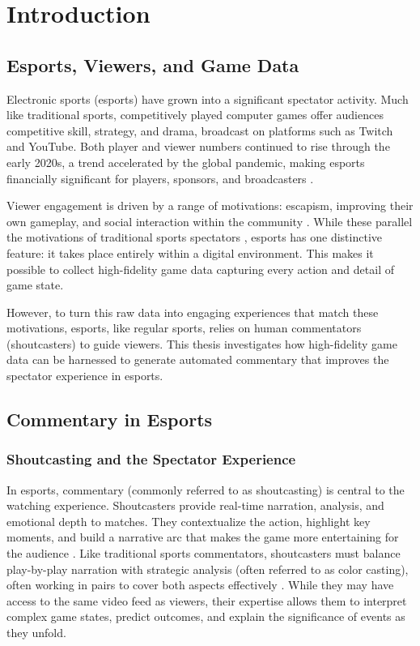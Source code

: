 \chapter{Introduction}
\label{chap:introduction}
\section{Esports, Viewers, and Game Data} 
Electronic sports (esports) have grown into a significant spectator activity. Much like traditional sports, competitively played computer games offer audiences competitive skill, strategy, and drama, broadcast on platforms such as Twitch and YouTube\cite{hamari2017, qian2020}. Both player and viewer numbers continued to rise through the early 2020s, a trend accelerated by the global pandemic, making esports financially significant for players, sponsors, and broadcasters \cite{heinrich2020, Newzoo2020}.

Viewer engagement is driven by a range of motivations: escapism, improving their own gameplay, and social interaction within the community \cite{hamari2017}. While these parallel the motivations of traditional sports spectators \cite{qian2020}, esports has one distinctive feature: it takes place entirely within a digital environment. This makes it possible to collect high-fidelity game data capturing every action and detail of game state.

However, to turn this raw data into engaging experiences that match these motivations, esports, like regular sports, relies on human commentators (shoutcasters) to guide viewers. This thesis investigates how high-fidelity game data can be harnessed to generate automated commentary that improves the spectator experience in esports.

\section{Commentary in Esports}
\subsection{Shoutcasting and the Spectator Experience}
In esports, commentary (commonly referred to as shoutcasting) is central to the watching experience. Shoutcasters provide real-time narration, analysis, and emotional depth to matches. They contextualize the action, highlight key moments, and build a narrative arc that makes the game more entertaining for the audience \cite{li2020}. Like traditional sports commentators, shoutcasters must balance play-by-play narration with strategic analysis (often referred to as color casting), often working in pairs to cover both aspects effectively \cite{kempecook2019}. While they may have access to the same video feed as viewers, their expertise allows them to interpret complex game states, predict outcomes, and explain the significance of events as they unfold.

